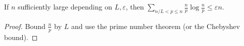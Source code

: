 \begin{sublemma}
\label{bound-score-4}
\leanok
If $n$ sufficiently large depending on $L, \varepsilon$, then
$\sum_{n/L < p \leq n} \frac{n}{p} \log \frac{n}{p} \leq \varepsilon n$.
\end{sublemma}
\begin{proof}
\leanok
Bound $\frac{n}{p}$ by $L$ and use the prime
  number theorem (or the Chebyshev bound).
\end{proof}
